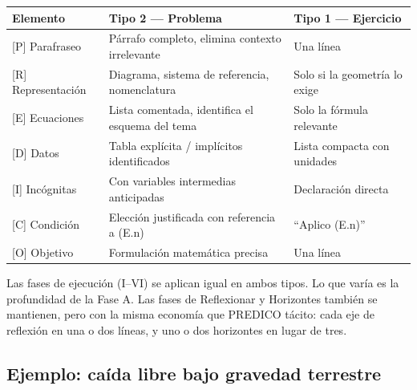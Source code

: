 \documentclass[11pt]{book}
\begin{document}
\medskip
\begin{center}
\small
\begin{tabular}{lll}
\hline
\textbf{Elemento} & \textbf{Tipo 2 — Problema} & \textbf{Tipo 1 — Ejercicio} \\
\hline
{[P]} Parafraseo       & Párrafo completo, elimina contexto irrelevante    & Una línea \\
{[R]} Representación   & Diagrama, sistema de referencia, nomenclatura     & Solo si la geometría lo exige \\
{[E]} Ecuaciones       & Lista comentada, identifica el esquema del tema   & Solo la fórmula relevante \\
{[D]} Datos            & Tabla explícita / implícitos identificados        & Lista compacta con unidades \\
{[I]} Incógnitas       & Con variables intermedias anticipadas             & Declaración directa \\
{[C]} Condición        & Elección justificada con referencia a (E.n)       & ``Aplico (E.n)'' \\
{[O]} Objetivo         & Formulación matemática precisa                    & Una línea \\
\hline
\end{tabular}
\end{center}

\medskip
Las fases de ejecución (I–VI) se aplican igual en ambos tipos. Lo que varía es la profundidad de la Fase A. Las fases de Reflexionar y Horizontes también se mantienen, pero con la misma economía que PREDICO tácito: cada eje de reflexión en una o dos líneas, y uno o dos horizontes en lugar de tres.

\subsection*{Ejemplo: caída libre bajo gravedad terrestre}
\end{document}
